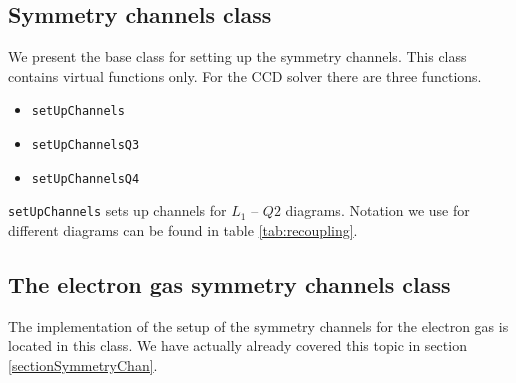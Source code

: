 \documentclass[twoside,english]{uiofysmaster}
\newcommand{\classname}[1]{\texttt{#1}}
\begin{document}
\subsection{Symmetry channels class}
We present the  base class for setting up the symmetry channels. This class contains virtual functions only.
For the CCD solver there are three functions. 
\begin{itemize}
	\item \classname{setUpChannels}
	\item \classname{setUpChannelsQ3}
	\item \classname{setUpChannelsQ4}
\end{itemize}
\classname{setUpChannels} sets up channels for $L_1$ -- $Q2$ diagrams. Notation we use for different diagrams can be found in table \ref{tab:recoupling}.

\subsection{The electron gas symmetry channels class}
The implementation of the setup of the symmetry channels for the electron gas is located in this class. We have actually already covered this topic in section \ref{sectionSymmetryChan}.
\end{document}

